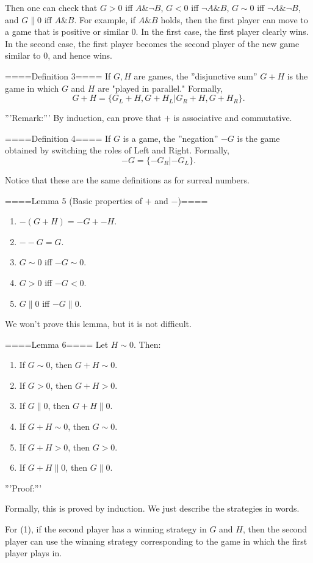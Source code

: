 Then one can check that $G>0$ iff $A\& \neg B$, $G<0$ iff $\neg A \& B$, $G\sim 0$ iff $\neg A \& \neg B$, and $G\parallel 0$ iff $A\& B$. For example, if $A \& B$ holds, then the first player can move to a game that is positive or similar $0$. In the first case, the first player clearly wins. In the second case, the first player becomes the second player of the new game similar to $0$, and hence wins.

====Definition 3====
If $G,H$ are games, the ''disjunctive sum'' $G+H$ is the game in which $G$ and $H$ are "played in parallel." Formally,
$$G+H=\{G_L+H,G+H_L|G_R+H, G+H_R\}.$$

'''Remark:'''
By induction, can prove that $+$ is associative and commutative. 

====Definition 4====
If $G$ is a game, the ''negation'' $-G$ is the game obtained by switching the roles of Left and Right. Formally,
$$-G=\{-G_R|-G_L\}.$$

Notice that these are the same definitions as for surreal numbers.

====Lemma 5 (Basic properties of $+$ and $-$)====
\begin{enumerate}
  \item  $-(G+H)=-G+-H$.
  \item  $--G=G$.
  \item  $G\sim 0$ iff $-G\sim 0$.
  \item  $G>0$ iff $-G<0$.
  \item  $G\parallel 0$ iff $-G\parallel 0$.
\end{enumerate}

We won't prove this lemma, but it is not difficult.

====Lemma 6====
Let $H\sim 0$. Then:
\begin{enumerate}
  \item  If $G\sim 0$, then $G+H\sim 0$.
  \item  If $G>0$, then $G+H>0$.
  \item  If $G\parallel 0$, then $G+H\parallel 0$.
  \item  If $G+H\sim 0$, then $G\sim 0$.
  \item  If $G+H>0$, then $G>0$.
  \item  If $G+H\parallel 0$, then $G\parallel 0$.
\end{enumerate}

'''Proof:'''

Formally, this is proved by induction. We just describe the strategies in words.

For (1), if the second player has a winning strategy in $G$ and $H$, then the second player can use the winning strategy corresponding to the game in which the first player plays in.

